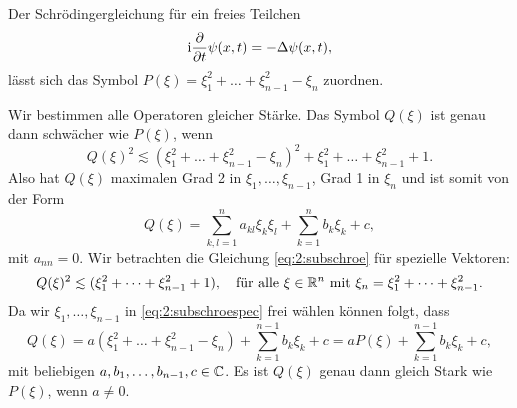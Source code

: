 \begin{exa}\label{exa:2:schroe}
Der Schrödingergleichung für ein freies Teilchen
\begin{equation}
\mathrm i\frac{\partial}{\partial t}\psi(x,t)=-\Delta\psi(x,t),\end{equation}
lässt sich das Symbol $P(\xi)=\xi^2_1+\dots+\xi^2_{n-1}-\xi_n$ zuordnen.

Wir bestimmen alle Operatoren gleicher Stärke.
Das Symbol $Q(\xi)$ ist genau dann schwächer wie $P(\xi)$,
wenn
\begin{equation}\label{eq:2:subschroe}
Q(\xi)^2\apprle(\xi^2_1+\dots+\xi^2_{n-1}-\xi_n)^2+\xi^2_1+\dots+\xi^2_{n-1}+1.
\end{equation}
Also hat $Q(\xi)$ maximalen Grad 2 in $\xi_1,\dots,\xi_{n-1}$,
Grad 1 in $\xi_n$ und ist somit von der Form
\begin{equation}
Q(\xi)=\sum^n_{k,l=1}a_{kl}\xi_k\xi_l+\sum^n_{k=1}b_k\xi_k+c,
\end{equation}
mit $a_{nn}=0$.
Wir betrachten die Gleichung \eqref{eq:2:subschroe}
für spezielle Vektoren:
\begin{equation}\label{eq:2:subschroespec}
Q(\xi)^2\apprle(\xi^2_1+\dots+\xi^2_{n-1}+1),
\quad\text{für alle}~\xi\in\R^n~\text{mit}~\xi_n=\xi^2_1+\dots+\xi^2_{n-1}.
\end{equation}
Da wir $\xi_1,\dots,\xi_{n-1}$ in \eqref{eq:2:subschroespec} frei wählen können folgt, dass
\begin{equation}
Q(\xi)=a(\xi^2_1+\dots+\xi^2_{n-1}-\xi_n)+\sum_{k=1}^{n-1}b_k\xi_k+c
=aP(\xi)+\sum_{k=1}^{n-1}b_k\xi_k+c,
\end{equation}
mit beliebigen $a,b_1,\dots,b_{n-1},c\in\mathbb C$.
Es ist $Q(\xi)$ genau dann gleich Stark wie $P(\xi)$,
wenn $a\neq0$.
\end{exa}

